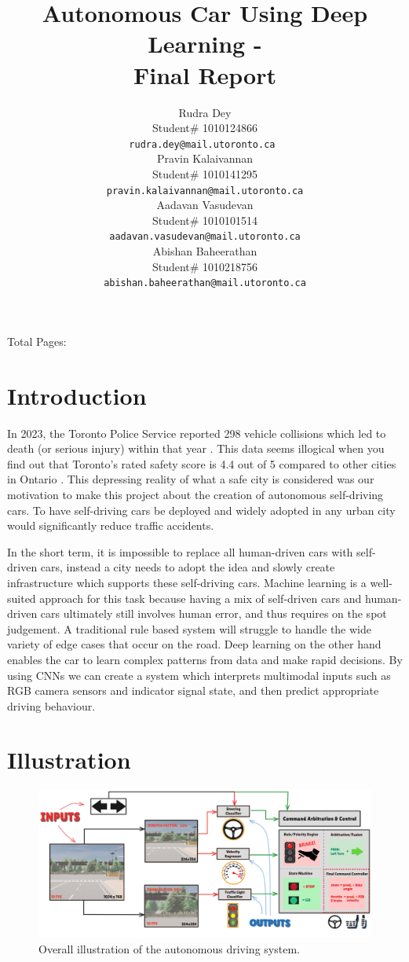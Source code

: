 \documentclass{article} %
\title{Autonomous Car Using Deep Learning - \\Final Report}
\author{Rudra Dey  \\
Student\# 1010124866\\
\texttt{rudra.dey@mail.utoronto.ca } \\
\And
Pravin Kalaivannan  \\
Student\# 1010141295 \\
\texttt{pravin.kalaivannan@mail.utoronto.ca} \\
\AND
Aadavan Vasudevan  \\
Student\# 1010101514 \\
\texttt{aadavan.vasudevan@mail.utoronto.ca} \\
\And
Abishan Baheerathan \\
Student\# 1010218756 \\
\texttt{abishan.baheerathan@mail.utoronto.ca} \\
\AND
}
\begin{document}
\maketitle

Total Pages: \pageref{last_page}


\section{Introduction}

In 2023, the Toronto Police Service reported 298 vehicle collisions which led to death (or serious injury) within that year \citep{toronto-ksi}. This data seems illogical when
you find out that Toronto’s rated safety score is 4.4 out of 5 compared to other cities in Ontario \citep{brokerlink2025ontario}.
This depressing reality of what a safe city is considered was our motivation to make this project about the creation of autonomous self-driving cars. To have self-driving cars be deployed and widely adopted in any urban city would significantly reduce traffic accidents.

In the short term, it is impossible to replace all human-driven cars with self-driven cars, instead a city needs to adopt the idea and slowly
create infrastructure which supports these self-driving cars. Machine learning is a well-suited approach for this task because having a mix of
self-driven cars and human-driven cars ultimately still involves human error, and thus requires on the spot judgement. A traditional rule based
system will struggle to handle the wide variety of edge cases that occur on the road. Deep learning on the other hand enables the car to learn
complex patterns from data and make rapid decisions. By using CNNs we can create a system which interprets multimodal inputs such as RGB camera
sensors and indicator signal state, and then predict appropriate driving behaviour.

\section{Illustration}


\begin{figure}[H] %
    \centering
    \includegraphics[width=1.0\textwidth]{newPic.png} %
    \caption{Overall illustration of the autonomous driving system.}
    \label{fig:illustrationExample}
\end{figure}
\end{document}

